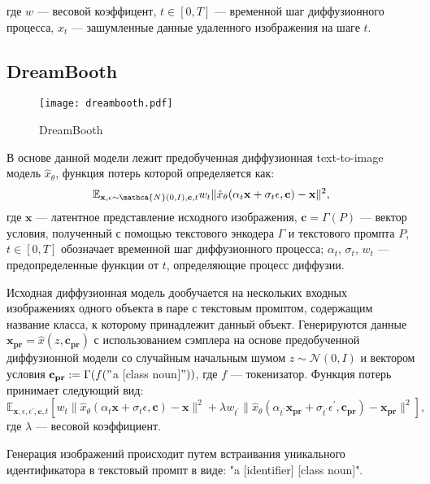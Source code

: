 \documentclass{article}
\begin{document}
где $w$ --- весовой коэффицент, $t \in [0, T]$ --- временной шаг диффузионного процесса, $x_t$ --- зашумленные данные удаленного изображения на шаге $t$.

\subsection{DreamBooth}

\begin{figure}[H]
    \centering
    \texttt{[image: dreambooth.pdf]}
    \caption{DreamBooth}
    \label{fig:simple}
\end{figure}

В основе данной модели лежит предобученная диффузионная text-to-image модель $\hat{x}_{\theta}$, функция потерь которой определяется как:
\begin{equation}
\mathbb{E}_{\mathbf{x}, \epsilon \sim \mathca{N}(0, I), \mathbf{c}, t} w_t \|\hat{x}_{\theta}(\alpha_t \mathbf{x} + \sigma_t \epsilon, \mathbf{c}) - \mathbf{x}\|^2,
\end{equation}
где $\mathbf{x}$ --- латентное представление исходного изображения, $\mathbf{c} = \Gamma(P)$ --- вектор условия, полученный с помощью текстового энкодера $\Gamma$ и текстового промпта $P$, $t \in [0, T]$ обозначает временной шаг диффузионного процесса; $\alpha_t$, $\sigma_t$, $w_t$ --- предопределенные функции от $t$, определяющие процесс диффузии. 

Исходная диффузионная модель дообучается на нескольких входных изображениях одного объекта в паре с текстовым промптом, содержащим название класса, к которому принадлежит данный объект. Генерируются данные  $\mathbf{x_{pr}} = \hat{x}(z, \mathbf{c_{pr}})$ с использованием сэмплера на основе предобученной диффузионной модели со случайным начальным шумом $z \sim \mathcal{N}(0, I)$ и вектором условия $\mathbf{c_{pr}} := \Gamma(f("$a [class  noun$]"))$, где $f$ --- токенизатор. Функция потерь принимает следующий вид: 
\begin{equation}
\mathbb{E}_{\mathbf{x}, \epsilon, \epsilon^{\prime}, \mathbf{c}, t} [w_t \|\hat{x}_{\theta}(\alpha_t \mathbf{x} + \sigma_t \epsilon, \mathbf{c}) - \mathbf{x}\|^2 + \lambda w_{t^{\prime}} \|\hat{x}_{\theta}(\alpha_{t^{\prime}} \mathbf{x_{pr}} + \sigma_{t^{\prime}} \epsilon^{\prime}, \mathbf{c_{pr}}) - \mathbf{x_{pr}}\|^2],
\end{equation}
где $\lambda$ --- весовой коэффициент.

Генерация изображений происходит путем встраивания уникального идентификатора в текстовый промпт в виде: "a [identifier] [class noun]". 
\end{document}
